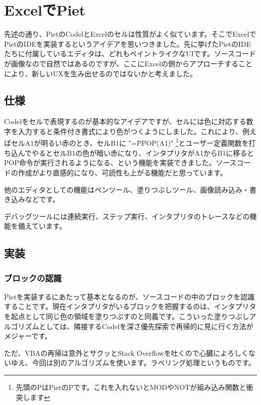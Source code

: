 \section{ExcelでPiet}
先述の通り、PietのCodelとExcelのセルは性質がよく似ています。そこでExcelでPietのIDEを実装するというアイデアを思いつきました。先に挙げたPietのIDEたちに付属しているエディタは、どれもペイントライクなUIです。ソースコードが画像なので自然ではあるのですが、ここにExcelの側からアプローチすることにより、新しいUXを生み出せるのではないかと考えました。

\subsection{仕様}
Codelをセルで表現するのが基本的なアイデアですが、セルには色に対応する数字を入力すると条件付き書式により色がつくようにしました。これにより、例えばセルA1が明るい赤のとき、セルB1に "=PPOP(A1)" \footnote{先頭のPはPietのPです。これを入れないとMODやNOTが組み込み関数と衝突します}とユーザー定義関数を打ち込んでやるとセルB1の色が暗い赤になり、インタプリタがA1からB1に移るとPOP命令が実行されるようになる、という機能を実装できました。ソースコードの作成がより直感的になり、可読性も上がる機能だと思っています。

他のエディタとしての機能はペンツール、塗りつぶしツール、画像読み込み・書き込みなどです。

デバッグツールには連続実行、ステップ実行、インタプリタのトレースなどの機能を備えています。

\subsection{実装}
\subsubsection{ブロックの認識}
Pietを実装するにあたって基本となるのが、ソースコードの中のブロックを認識することです。現在インタプリタがいるブロックを把握するのは、インタプリタを起点として同じ色の領域を塗りつぶすのと同義です。こういった塗りつぶしアルゴリズムとしては、隣接するCodelを深さ優先探索で再帰的に見に行く方法がメジャーです。


ただ、VBAの再帰は意外とサクッとStack Overflowを吐くので心臓によろしくないゆえ、今回は別のアルゴリズムを使います。ラベリング処理というものです。


